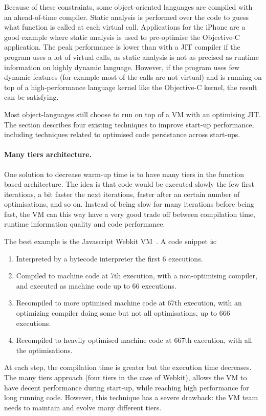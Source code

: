 \documentclass[a4paper,12pt,twoside]{../includes/ThesisStyle}
\begin{document}
Because of these constraints, some object-oriented languages are compiled with an ahead-of-time compiler. Static analysis is performed over the code to guess what function is called at each virtual call. Applications for the iPhone are a good example where static analysis is used to pre-optimise the Objective-C application. The peak performance is lower than with a JIT compiler if the program uses a lot of virtual calls, as static analysis is not as precised as runtime information on highly dynamic language. However, if the program uses few dynamic features (for example most of the calls are not virtual) and is running on top of a high-performance language kernel like the Objective-C kernel, the result can be satisfying.

Most object-languages still choose to run on top of a VM with an optimising JIT. The section describes four existing techniques to improve start-up performance, including techniques related to optimised code persistance across start-ups.

\paragraph{Many tiers architecture.}
One solution to decrease warm-up time is to have many tiers in the function based architecture. The idea is that code would be executed slowly the few first iterations, a bit faster the next iterations, faster after an certain number of optimisations, and so on. Instead of being slow for many iterations before being fast, the VM can this way have a very good trade off between compilation time, runtime information quality and code performance.

The best example is the Javascript Webkit VM~\cite{Webkit15}. A code snippet is:
\begin{enumerate}
\item Interpreted by a bytecode interpreter the first 6 executions.
\item Compiled to machine code at 7th execution, with a non-optimising compiler, and executed as machine code up to 66 executions.
\item Recompiled to more optimised machine code at 67th execution, with an optimizing compiler doing some but not all optimisations, up to 666 executions.
\item Recompiled to heavily optimised machine code at 667th execution, with all the optimisations.
\end{enumerate}

At each step, the compilation time is greater but the execution time decreases. The many tiers approach (four tiers in the case of Webkit), allows the VM to have decent performance during start-up, while reaching high performance for long running code. However, this technique has a severe drawback: the VM team needs to maintain and evolve many different tiers.
\end{document}
